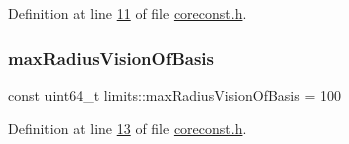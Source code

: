 Definition at line \hyperlink{a00020_source_l00011}{11} of file \hyperlink{a00020_source}{coreconst.\+h}.

\mbox{\label{a00115_aa57018b6545bade5e6f69133071a1342}} 
\subsubsection{\texorpdfstring{max\+Radius\+Vision\+Of\+Basis}{maxRadiusVisionOfBasis}}
{\footnotesize\ttfamily const uint64\+\_\+t limits\+::max\+Radius\+Vision\+Of\+Basis = 100}



Definition at line \hyperlink{a00020_source_l00013}{13} of file \hyperlink{a00020_source}{coreconst.\+h}.

